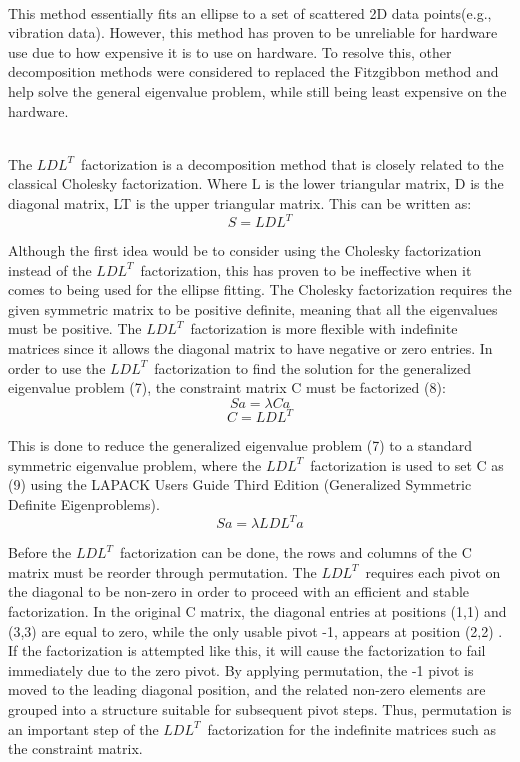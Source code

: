 \documentclass[11pt,a4paper]{article}
\begin{document}
\\This method essentially fits an ellipse to a set of scattered 2D data points(e.g., vibration data). However, this method has proven to be unreliable for hardware use due to how expensive it is to use on hardware. To resolve this, other decomposition methods were considered to replaced the Fitzgibbon method and help solve the general eigenvalue problem, while still being least expensive on the hardware.  

\\The $LDL^{T}\,$ factorization is a decomposition method that is closely related to the classical Cholesky factorization. Where L is the lower triangular matrix, D is the diagonal matrix, LT is the upper triangular matrix. This can be written as: 
\begin{equation}
    S = LDL^{T}
\end{equation}

Although the first idea would be to consider using the Cholesky factorization instead of the $LDL^{T}\,$ factorization, this has proven to be ineffective when it comes to being used for the ellipse fitting. The Cholesky factorization requires the given symmetric matrix to be positive definite, meaning that all the eigenvalues must be positive. The $LDL^{T}\,$ factorization is more flexible with indefinite matrices since it allows the diagonal matrix to have negative or zero entries. 
In order to use the $LDL^{T}\,$ factorization  to find the solution for the generalized eigenvalue problem (7), the constraint matrix C must be factorized (8):
\begin{equation}
    Sa = \lambda Ca
\end{equation}
\begin{equation}
    C = LDL^{T}
\end{equation}

This is done to reduce the generalized eigenvalue problem (7) to a standard symmetric eigenvalue problem, where the $LDL^{T}\,$ factorization is used to set C as (9) using the LAPACK Users Guide Third Edition (Generalized Symmetric Definite Eigenproblems).
\begin{equation}
    Sa = \lambda LDL^{T}a
\end{equation}

Before the $LDL^{T}\,$ factorization can be done, the rows and columns of the C matrix must be reorder through permutation. The $LDL^{T}\,$ requires each pivot on the diagonal to be non-zero in order to proceed with an efficient and stable factorization. In the original C matrix, the diagonal entries at positions (1,1) and (3,3) are equal to zero, while the only usable pivot -1, appears at position (2,2) . If the factorization is attempted like this, it will cause the factorization to fail immediately due to the zero pivot. By applying permutation, the -1 pivot is moved to the leading diagonal position, and the related non-zero elements are grouped into a structure suitable for subsequent pivot steps. Thus, permutation is an important step of the $LDL^{T}\,$ factorization for the indefinite matrices such as the constraint matrix. 
\end{document}
